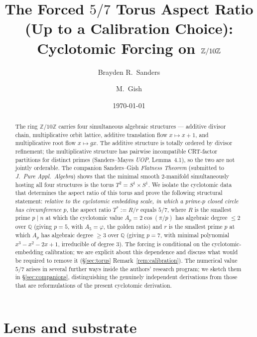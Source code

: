 \documentclass[11pt,reqno]{amsart}
\title[The forced $5/7$ torus (up to a calibration choice)]{The Forced $5/7$ Torus Aspect Ratio (Up to a Calibration Choice):\\
Cyclotomic Forcing on $\Z/10\Z$}
\author{Brayden R.\ Sanders}
\author{M.\ Gish}
\date{\today}
\theoremstyle{plain}
\theoremstyle{definition}
\newcommand{\Z}{\mathbb{Z}}
\newcommand{\Q}{\mathbb{Q}}
\newcommand{\Zts}{\Z/10\Z}
\begin{document}
\begin{abstract}
The ring $\Zts$ carries four simultaneous algebraic structures --- additive divisor chain, multiplicative orbit lattice, additive translation flow $x \mapsto x+1$, and multiplicative root flow $x \mapsto gx$. The additive structure is totally ordered by divisor refinement; the multiplicative structure has pairwise incompatible CRT-factor partitions for distinct primes (Sanders--Mayes \emph{UOP}, Lemma~4.1), so the two are not jointly orderable. The companion Sanders--Gish \emph{Flatness Theorem} (submitted to \emph{J.\ Pure Appl.\ Algebra}) shows that the minimal smooth $2$-manifold simultaneously hosting all four structures is the torus $T^2 = S^1 \times S^1$. We isolate the cyclotomic data that determines the aspect ratio of this torus and prove the following structural statement: \emph{relative to the cyclotomic embedding scale, in which a prime-$p$ closed circle has circumference $p$,} the aspect ratio $T^{*} := R/r$ equals $5/7$, where $R$ is the smallest prime $p \mid n$ at which the cyclotomic value $A_p = 2 \cos(\pi/p)$ has algebraic degree $\le 2$ over $\Q$ (giving $p = 5$, with $A_5 = \varphi$, the golden ratio) and $r$ is the smallest prime $p$ at which $A_p$ has algebraic degree $\ge 3$ over $\Q$ (giving $p = 7$, with minimal polynomial $x^{3} - x^{2} - 2x + 1$, irreducible of degree $3$). The forcing is conditional on the cyclotomic-embedding calibration; we are explicit about this dependence and discuss what would be required to remove it (\S\ref{sec:torus} Remark~\ref{rem:calibration}). The numerical value $5/7$ arises in several further ways inside the authors' research program; we sketch them in \S\ref{sec:companions}, distinguishing the genuinely independent derivations from those that are reformulations of the present cyclotomic derivation.
\end{abstract}

\maketitle

\section*{Lens and substrate}
\end{document}
